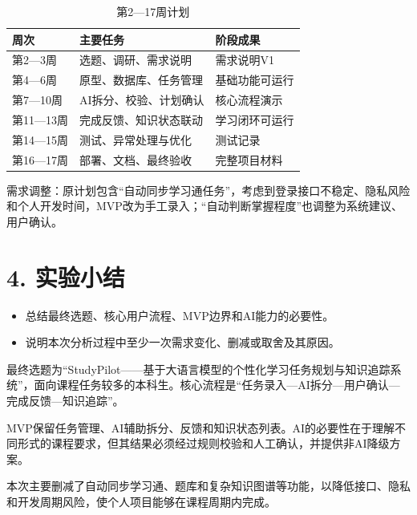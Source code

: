 \documentclass[UTF8,12pt,a4paper]{ctexart}
\begin{document}
\begin{table}[htbp]
\centering
\caption{第2—17周计划}
\small
\begin{tabular}{p{2.2cm}p{8.0cm}p{3.0cm}}
\toprule
周次 & 主要任务 & 阶段成果 \\
\midrule
第2—3周 & 选题、调研、需求说明 & 需求说明V1 \\
第4—6周 & 原型、数据库、任务管理 & 基础功能可运行 \\
第7—10周 & AI拆分、校验、计划确认 & 核心流程演示 \\
第11—13周 & 完成反馈、知识状态联动 & 学习闭环可运行 \\
第14—15周 & 测试、异常处理与优化 & 测试记录 \\
第16—17周 & 部署、文档、最终验收 & 完整项目材料 \\
\bottomrule
\end{tabular}
\end{table}

需求调整：原计划包含“自动同步学习通任务”，考虑到登录接口不稳定、隐私风险和个人开发时间，MVP改为手工录入；“自动判断掌握程度”也调整为系统建议、用户确认。

\section*{4. 实验小结}

\begin{itemize}
  \item 总结最终选题、核心用户流程、MVP边界和AI能力的必要性。
  \item 说明本次分析过程中至少一次需求变化、删减或取舍及其原因。
\end{itemize}

最终选题为“StudyPilot——基于大语言模型的个性化学习任务规划与知识追踪系统”，面向课程任务较多的本科生。核心流程是“任务录入—AI拆分—用户确认—完成反馈—知识追踪”。

MVP保留任务管理、AI辅助拆分、反馈和知识状态列表。AI的必要性在于理解不同形式的课程要求，但其结果必须经过规则校验和人工确认，并提供非AI降级方案。

本次主要删减了自动同步学习通、题库和复杂知识图谱等功能，以降低接口、隐私和开发周期风险，使个人项目能够在课程周期内完成。
\end{document}
